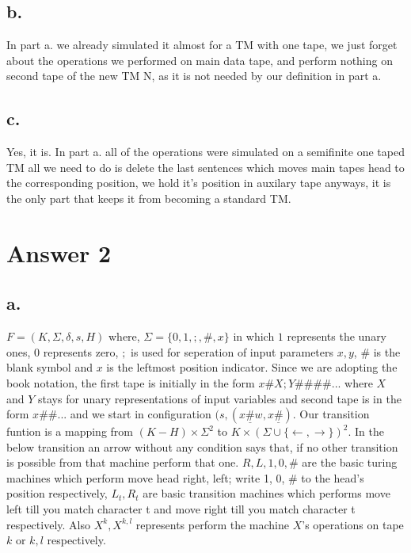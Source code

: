 \documentclass[12pt]{article}
\begin{document}
\subsection*{b.}
In part a. we already simulated it almost for a TM with one tape, we just forget
about the operations we performed on main data tape, and perform nothing on
second tape of the new TM N, as it is not needed by our definition in part a.

\subsection*{c.}
Yes, it is. In part a. all of the operations were simulated on a semifinite one taped TM
all we need to do is delete the last sentences which moves main tapes head to the
corresponding position, we hold it's position in auxilary tape anyways, it is the
only part that keeps it from becoming a standard TM.



\section*{Answer 2}

\subsection*{a.}
$F=(K, \Sigma, \delta, s, H)$ where, $\Sigma = \{0,1,;,\#,x\}$ in which $1$
represents the unary ones, $0$ represents zero, $;$ is used for seperation
of input parameters $x, y$, $\#$ is the blank symbol and $x$ is the leftmost
position indicator. Since we are adopting the book notation, the first tape
is initially in the form ${x\#X;Y\#\#\#\#...}$ where $X$ and $Y$ stays for unary
representations of input variables and second tape is in the form ${x\#\#...}$
and we start in configuration ${(s, (x\underline{\#}w, x\underline{\#})}$.
Our transition funtion is a mapping from $(K-H)\times \Sigma^2$ to 
$K\times (\Sigma \cup \{\leftarrow, \rightarrow \})^2$. In the below
transition an arrow without any condition says that, if no other transition
is possible from that machine perform that one. $R,L,1,0,\#$ are the
basic turing machines which perform move head right, left; write 1, 0, \#
to the head's position respectively, $L_t,R_t$ are basic transition machines
which performs move left till you match character t and move right till you
match character t respectively. Also $X^k, X^{k,l}$ represents perform the
machine $X$'s operations on tape $k$ or $k,l$ respectively.
\end{document}
